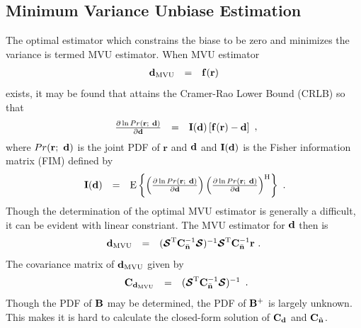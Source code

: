 \documentclass[a4paper,10pt,fleqn, twocolumn]{IEEETran}
\newcommand{\br}{{\mathbf r}}
\newcommand{\bC}{{\bf C}}
\newcommand{\bd}{{\bf d}}
\newcommand{\bn}{{\bf n}}
\newcommand{\bbf}{{\bf d}}
\newcommand{\bI}{{\bf I}}
\newcommand{\bB}{{\bf B}}
\newcommand{\bcS}{{\mbox {\boldmath ${\cal S}$}}}
\begin{document}
\subsection{Minimum Variance Unbiase Estimation}
The optimal estimator which constrains the biase to be zero and
minimizes the variance is termed MVU estimator. When MVU estimator
\begin{equation}
\begin{array}{rcl}
{\bd}_{\rm MVU}&=&{\bf f}(\br)
\end{array}
\end{equation}
exists, it may be found that attains the Cramer-Rao Lower Bound
(CRLB) so that
\begin{equation}
\begin{array}{rcl}
\frac{\partial\ln Pr(\br;\ \bd)}{\partial\bd}&=&\bI(\bd)\left[{\bf
f}(\br)-\bd\right]
\end{array},
\end{equation}
\noindent where $Pr(\br;\ \bd)$ is the joint PDF of $\br$ and
$\bd$ and $\bI(\bd)$ is the Fisher information matrix (FIM)
defined by
\begin{equation}\hspace{-0.04in}
\begin{array}{rcl}
$\bI(\bd)$ &=& {\rm E} \left\{ \left( \frac{\partial \ln{Pr(\br;\
\bd)}}{\partial \bd} \right) \left( \frac{\partial \ln{Pr(\br;\
\bd)}}{\partial \bd} \right)^{\rm H} \right\}
\end{array}.
\end{equation}
\noindent Though the determination of the optimal MVU estimator is
generally a difficult, it can be evident with linear constriant.
The MVU estimator for $\bd$ then is~\cite{Key93}
\begin{equation}
\begin{array}{rcl}
{\bbf}_{\rm MVU}&=&(\bcS^{\rm
T}\bC_{\bar{\bn}}^{-1}\bcS)^{-1}\bcS^{\rm
T}\bC_{\bar{\bn}}^{-1}\br\ .
\end{array} \label{BLUE}
\end{equation}
\noindent The covariance matrix of ${\bbf}_{\rm MVU}$ given by
\begin{equation}
\begin{array}{rcl}
{\bC}_{\bd_{\rm MVU}}&=&(\bcS^{\rm
T}\bC_{\bar{\bn}}^{-1}\bcS)^{-1}
\end{array}.
\end{equation}
\noindent Though the PDF of $\bB$ may be determined, the PDF of
$\bB^{+}$ is largely unknown. This makes it is hard to calculate
the closed-form solution of $\bC_{\bd}$ and $\bC_{\tilde{\bn}}$.
\end{document}

